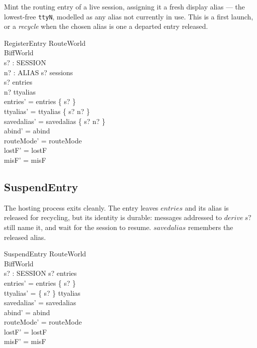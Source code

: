 \documentclass[a4paper,10pt,fleqn]{article}
\begin{document}
Mint the routing entry of a live session, assigning it a fresh
display alias --- the lowest-free \texttt{ttyN}, modelled as any alias
not currently in use.  This is a first launch, or a \emph{recycle} when
the chosen alias is one a departed entry released.

\begin{schema}{RegisterEntry}
  \Delta RouteWorld \\
  \Xi BiffWorld \\
  s? : SESSION \\
  n? : ALIAS
  \where
  s? \in sessions \\
  s? \notin entries \\
  n? \notin \ran ttyalias \\
  entries' = entries \cup \{ s? \} \\
  ttyalias' = ttyalias \cup \{ s? \mapsto n? \} \\
  savedalias' = savedalias \oplus \{ s? \mapsto n? \} \\
  abind' = abind \\
  routeMode' = routeMode \\
  lostF' = lostF \\
  misF' = misF
\end{schema}

\subsection{SuspendEntry}

The hosting process exits cleanly.  The entry leaves $entries$ and its
alias is released for recycling, but its identity is durable: messages
addressed to $derive~s?$ still name it, and wait for the session to
resume.  $savedalias$ remembers the released alias.

\begin{schema}{SuspendEntry}
  \Delta RouteWorld \\
  \Xi BiffWorld \\
  s? : SESSION
  \where
  s? \in entries \\
  entries' = entries \setminus \{ s? \} \\
  ttyalias' = \{ s? \} \ndres ttyalias \\
  savedalias' = savedalias \\
  abind' = abind \\
  routeMode' = routeMode \\
  lostF' = lostF \\
  misF' = misF
\end{schema}
\end{document}
